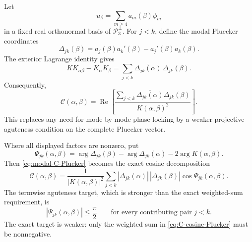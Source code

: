 \documentclass[11pt]{amsart}
\numberwithin{equation}{section}
\theoremstyle{plain}
\theoremstyle{definition}
\theoremstyle{remark}
\newcommand{\Pcal}{\mathcal P}
\newcommand{\Ccal}{\mathcal C}
\newcommand{\Ree}{\operatorname{Re}}
\begin{document}
Let
\begin{equation}
u_\beta=\sum_{m\ge4}a_m(\beta)\phi_m
\label{eq:modal-u-plucker}
\end{equation}
in a fixed real orthonormal basis of \(\Pcal_3^\perp\).  For \(j<k\), define the modal Pluecker coordinates
\begin{equation}
\boxed{
\Delta_{jk}(\beta)
=a_j(\beta)a_k'(\beta)-a_j'(\beta)a_k(\beta).
}
\label{eq:modal-Delta-jk}
\end{equation}
The exterior Lagrange identity gives
\begin{equation}
\boxed{
K K_{\alpha\beta}-K_\alpha K_\beta
=
\sum_{j<k}
\overline{\Delta_{jk}(\alpha)}\,\Delta_{jk}(\beta).
}
\label{eq:modal-Lagrange}
\end{equation}
Consequently,
\begin{equation}
\boxed{
\Ccal(\alpha,\beta)
=
\Ree\left[
\frac{\displaystyle\sum_{j<k}
\overline{\Delta_{jk}(\alpha)}\Delta_{jk}(\beta)}
{K(\alpha,\beta)^2}
\right].
}
\label{eq:modal-C-Plucker}
\end{equation}
This replaces any need for mode-by-mode phase locking by a weaker projective aguteness condition on the complete Pluecker vector.

Where all displayed factors are nonzero, put
\begin{equation}
\Psi_{jk}(\alpha,\beta)
=
\arg\Delta_{jk}(\beta)
-
\arg\Delta_{jk}(\alpha)
-
2\arg K(\alpha,\beta).
\label{eq:Psi-jk}
\end{equation}
Then \eqref{eq:modal-C-Plucker} becomes the exact cosine decomposition
\begin{equation}
\boxed{
\Ccal(\alpha,\beta)
=
\frac{1}{|K(\alpha,\beta)|^2}
\sum_{j<k}
|\Delta_{jk}(\alpha)|\,|\Delta_{jk}(\beta)|
\cos\Psi_{jk}(\alpha,\beta).
}
\label{eq:C-cosine-Plucker}
\end{equation}
The termwise aguteness target, which is stronger than the exact weighted-sum requirement, is
\begin{equation}
|\Psi_{jk}(\alpha,\beta)|\le\frac\pi2
\qquad\text{for every contributing pair }j<k.
\label{eq:pairwise-acute-sufficient}
\end{equation}
The exact target is weaker: only the weighted sum in \eqref{eq:C-cosine-Plucker} must be nonnegative.
\end{document}
